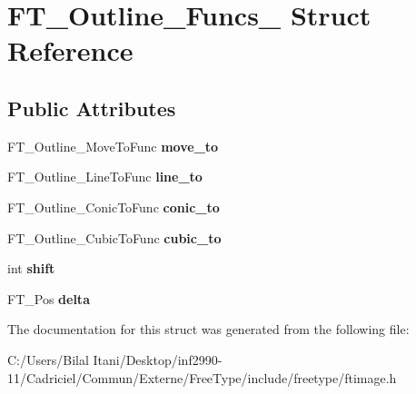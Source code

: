 \hypertarget{struct_f_t___outline___funcs__}{}\section{F\+T\+\_\+\+Outline\+\_\+\+Funcs\+\_\+ Struct Reference}
\label{struct_f_t___outline___funcs__}
\subsection*{Public Attributes}
\begin{DoxyCompactItemize}
\item 
F\+T\+\_\+\+Outline\+\_\+\+Move\+To\+Func {\bfseries move\+\_\+to}\hypertarget{struct_f_t___outline___funcs___abd53463a59a1ae2c6998e619c2ab6a65}{}\label{struct_f_t___outline___funcs___abd53463a59a1ae2c6998e619c2ab6a65}

\item 
F\+T\+\_\+\+Outline\+\_\+\+Line\+To\+Func {\bfseries line\+\_\+to}\hypertarget{struct_f_t___outline___funcs___a876fc8ca7541786cd3c4ec3806f88360}{}\label{struct_f_t___outline___funcs___a876fc8ca7541786cd3c4ec3806f88360}

\item 
F\+T\+\_\+\+Outline\+\_\+\+Conic\+To\+Func {\bfseries conic\+\_\+to}\hypertarget{struct_f_t___outline___funcs___a09681f5a64189066d3fba3cf398a135b}{}\label{struct_f_t___outline___funcs___a09681f5a64189066d3fba3cf398a135b}

\item 
F\+T\+\_\+\+Outline\+\_\+\+Cubic\+To\+Func {\bfseries cubic\+\_\+to}\hypertarget{struct_f_t___outline___funcs___aa3e0c1bacb181a5f43c104ab7f72cfda}{}\label{struct_f_t___outline___funcs___aa3e0c1bacb181a5f43c104ab7f72cfda}

\item 
int {\bfseries shift}\hypertarget{struct_f_t___outline___funcs___a540c246669b21b86cb405b3d9019cfda}{}\label{struct_f_t___outline___funcs___a540c246669b21b86cb405b3d9019cfda}

\item 
F\+T\+\_\+\+Pos {\bfseries delta}\hypertarget{struct_f_t___outline___funcs___a3c3121398b3ff564b4f3fd5b2a318e5e}{}\label{struct_f_t___outline___funcs___a3c3121398b3ff564b4f3fd5b2a318e5e}

\end{DoxyCompactItemize}


The documentation for this struct was generated from the following file\+:\begin{DoxyCompactItemize}
\item 
C\+:/\+Users/\+Bilal Itani/\+Desktop/inf2990-\/11/\+Cadriciel/\+Commun/\+Externe/\+Free\+Type/include/freetype/ftimage.\+h\end{DoxyCompactItemize}
